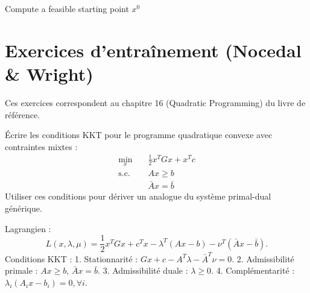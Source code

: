 \begin{algorithm}[H]
    \caption{Gradient projection method for Quadratic Programming}
    \SetAlgoLined
    Compute a feasible starting point $x^0$\;
\end{algorithm}

\section{Exercices d'entraînement (Nocedal \& Wright)}
\label{sec:11.exercises}

Ces exercices correspondent au chapitre 16 (Quadratic Programming) du livre de référence.

\bigskip
\begin{exercice}
Écrire les conditions KKT pour le programme quadratique convexe avec contraintes mixtes :
\begin{align*}
    \min_x \quad & \frac{1}{2} x^T G x + x^T c \\
    \text{s.c. } \quad & Ax \ge b \\
               & \bar{A}x = \bar{b}
\end{align*}
Utiliser ces conditions pour dériver un analogue du système primal-dual générique.
\end{exercice}

\begin{correction}
Lagrangien :
$$ L(x, \lambda, \mu) = \frac{1}{2}x^T G x + c^T x - \lambda^T (Ax - b) - \nu^T (\bar{A}x - \bar{b}). $$
Conditions KKT :
1. Stationnarité : $Gx + c - A^T \lambda - \bar{A}^T \nu = 0$.
2. Admissibilité primale : $Ax \ge b$, $\bar{A}x = \bar{b}$.
3. Admissibilité duale : $\lambda \ge 0$.
4. Complémentarité : $\lambda_i (A_i x - b_i) = 0, \forall i$.
\end{correction}
\bigskip

